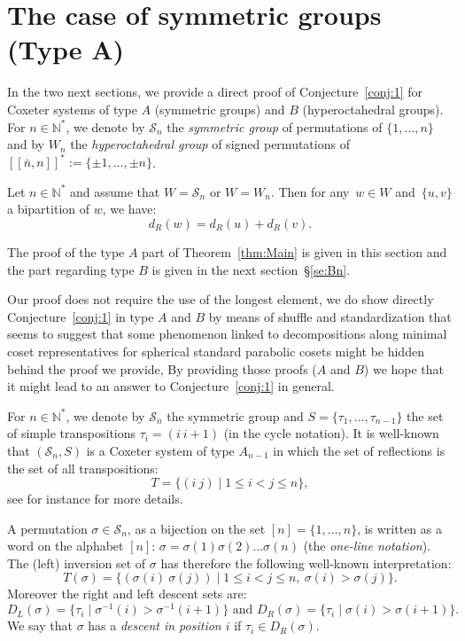 \documentclass[Unicode]{cedram-alco}
\theoremstyle{definition}
\newcommand{\Sym}[1]{\mathcal{S}_{#1}}
\newcommand{\Symn}{\Sym{n}}
\newcommand{\Bsetnn}{[\![\bar{n},n ]\!]^*}
\begin{document}
\section{The case of symmetric groups (Type A)}\label{se:Sn}


In  the two next sections, we provide a direct proof of Conjecture~\ref{conj:1} for Coxeter systems of type $A$ (symmetric groups) and $B$ (hyperoctahedral groups). For $n\in\mathbb N^*$, we denote by $\mathcal S_n$ the {\em symmetric group} of permutations of $\{1,\dots , n\}$  and by $W_n$ the {\em hyperoctahedral group} of signed permutations of  $\Bsetnn:=\{\pm 1,\dots,\pm n\}$.

\begin{thm}\label{thm:Main} Let $n\in\mathbb N^*$ and assume  that $W=\mathcal S_n$ or $W=W_n$. Then for any~$w\in W$ and~$\{u,v\}$ a bipartition of $w$, we have:
 $$
 d_R(w)=d_R(u)+d_R(v).
 $$
\end{thm}

The proof of the type $A$  part of Theorem~\ref{thm:Main} is given in this section  and the part regarding type $B$ is given in the next section~\S\ref{se:Bn}. 

\begin{remark}\label{rem:GeneralizeAB} Our proof does not require the use of the longest element, we do show directly Conjecture~\ref{conj:1} in type $A$ and $B$ by means of shuffle and standardization that seems to suggest that some phenomenon linked to decompositions along minimal coset representatives for spherical standard parabolic cosets might be hidden behind the proof we provide, By providing those proofs ($A$ and $B$) we hope that it might lead to an answer to Conjecture~\ref{conj:1} in general.  
\end{remark}




For $n\in\mathbb N^*$, we denote by $\Symn$ the symmetric group and $S=\{\tau_1,\dots,\tau_{n-1}\}$ the set of simple transpositions $\tau_i = (i\ i+1)$ (in the cycle notation). It is well-known that $(\Symn,S)$ is a Coxeter system of type $A_{n-1}$ in which the set of reflections is the set of all transpositions:
$$
T=\{(i\ j)\mid 1\leq i<j\leq n\},
$$
see for instance \cite[Chapters 1 and 2]{BjBr05} for more details.

A permutation  $\sigma \in \Symn$, as a bijection on the set $[n]=\{1,\dots,n\}$, is written as a word on the alphabet $[n]$: $\sigma=\sigma(1) \sigma(2) \dots \sigma(n)$ (the  {\em one-line notation}). The (left) inversion set of $\sigma$ has therefore the following well-known interpretation: 
$$
T(\sigma)=\{(\sigma(i)\ \sigma(j))\mid 1\leq i<j\leq n,\ \sigma(i)>\sigma(j) \}.
$$
Moreover the right and left descent sets are:
$$
D_L(\sigma)=\{\tau_i \mid \sigma^{-1}(i)>\sigma^{-1}(i+1)\}\textrm{ and }D_R(\sigma)=\{\tau_i \mid \sigma(i)>\sigma(i+1)\}.
$$
We say that $\sigma$ has a \emph{descent in position $i$} if $\tau_i\in D_R(\sigma)$.
\end{document}
